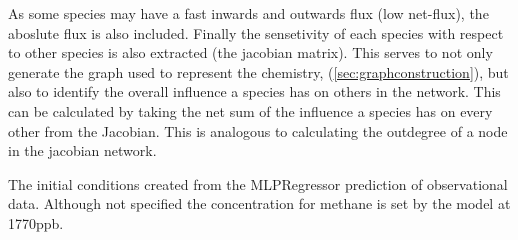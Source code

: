 As some species may have a fast inwards and outwards flux (low net-flux), the aboslute flux is also included. Finally the sensetivity of each species with respect to other species is also extracted (the jacobian matrix). This serves to not only generate the graph used to represent the chemistry, (\autoref{sec:graphconstruction}), but also to identify the overall influence a species has on others in the network. This can be calculated by taking the net sum of the influence a species has on every other from the Jacobian. This is analogous to calculating the outdegree of a node in the jacobian network. 
\newpage
 
\begin{table}[H]
    \centering
\begin{small}

\end{small}
\label{tab:icsmetric}
\caption{The initial conditions created from the MLPRegressor prediction of observational data. Although not specified the concentration for methane is set by the model at 1770ppb.}
\end{table}
\newpage


